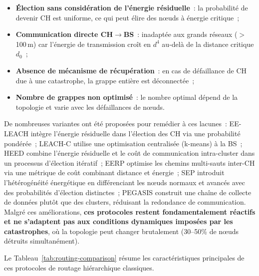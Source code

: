 \begin{itemize}
    \item \textbf{Élection sans considération de l'énergie résiduelle}~: la probabilité de devenir CH est uniforme, ce qui peut élire des n\oe{}uds à énergie critique~;
    \item \textbf{Communication directe CH$\to$BS}~: inadaptée aux grands réseaux ($>$100\,m) car l'énergie de transmission croît en $d^4$ au-delà de la distance critique $d_0$~;
    \item \textbf{Absence de mécanisme de récupération}~: en cas de défaillance de CH due à une catastrophe, la grappe entière est déconnectée~;
    \item \textbf{Nombre de grappes non optimisé}~: le nombre optimal dépend de la topologie et varie avec les défaillances de n\oe{}uds.
\end{itemize}

De nombreuses variantes ont été proposées pour remédier à ces lacunes~: EE-LEACH \cite{kumar2012eeleach} intègre l'énergie résiduelle dans l'élection des CH via une probabilité pondérée~; LEACH-C \cite{heinzelman2002leach} utilise une optimisation centralisée (k-means) à la BS~; HEED \cite{younis2004heed} combine l'énergie résiduelle et le coût de communication intra-cluster dans un processus d'élection itératif~; EERP \cite{sha2013eerp} optimise les chemins multi-sauts inter-CH via une métrique de coût combinant distance et énergie~; SEP \cite{smaragdakis2004sep} introduit l'hétérogénéité énergétique en différenciant les n\oe{}uds normaux et avancés avec des probabilités d'élection distinctes~; PEGASIS \cite{lindsey2002pegasis} construit une chaîne de collecte de données plutôt que des clusters, réduisant la redondance de communication. Malgré ces améliorations, \textbf{ces protocoles restent fondamentalement réactifs et ne s'adaptent pas aux conditions dynamiques imposées par les catastrophes}, où la topologie peut changer brutalement (30--50\% de n\oe{}uds détruits simultanément).

Le Tableau~\ref{tab:routing-comparison} résume les caractéristiques principales de ces protocoles de routage hiérarchique classiques.

